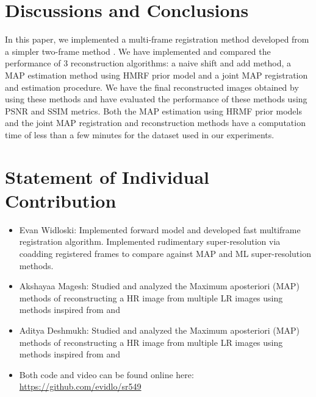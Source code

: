 \documentclass[10pt,twocolumn,letterpaper]{article}
\begin{document}
\section{Discussions and Conclusions}

In this paper, we implemented a multi-frame registration method developed from a simpler two-frame method \cite{guizar}. 
We have implemented and compared the performance of 3 reconstruction algorithms: a naive shift and add method, a MAP estimation method using HMRF prior model and a joint MAP registration and estimation procedure. We have the final reconstructed images obtained by using these methods and have evaluated the performance of these methods using PSNR and SSIM metrics. Both the MAP estimation using HRMF prior models and the joint MAP registration and reconstruction methods have a computation time of less than a few minutes for the dataset used in our experiments. 

\section{Statement of Individual Contribution}
\begin{itemize}
    \item Evan Widloski: Implemented forward model and developed fast multiframe registration algorithm.  Implemented rudimentary super-resolution via coadding registered frames to compare against MAP and ML super-resolution methods.
    \item Akshayaa Magesh: Studied and analyzed the Maximum aposteriori (MAP) methods of reconstructing a HR image from multiple LR images using  methods inspired from \cite{hardie1997joint} and \cite{schultz1996extraction}
    \item Aditya Deshmukh: Studied and analyzed the Maximum aposteriori (MAP) methods of reconstructing a HR image from multiple LR images using  methods inspired from \cite{hardie1997joint} and \cite{schultz1996extraction}
    
    \item Both code and video can be found online here: \url{https://github.com/evidlo/sr549}
\end{itemize}

{\small


}
\end{document}
